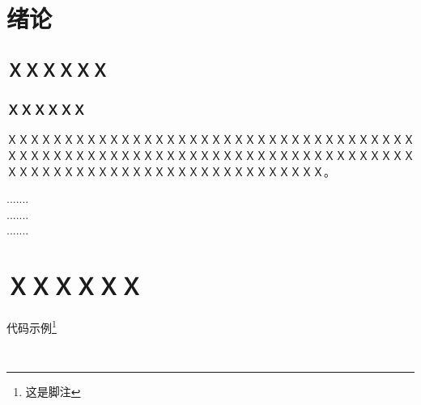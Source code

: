 \documentclass[a4paper]{ltxdoc}
\begin{document}
{
\setlength{\cftfignumwidth}{3.5em}
\setlength{\cfttabnumwidth}{3.5em}
\clearpage
\tableofcontents
{}

\clearpage
\listoffigures

\clearpage
\listoftables

}

\fancyhead{}
\pagestyle{fancy}

{
\setcounter{page}{1}
\pretocmd{\section}{\clearpage \vspace*{-2.0em}}{}{}

\setlength{\parindent}{2em}
\setlength{\parskip}{0.5em}
\setlength{\baselineskip}{22pt}

\section{绪论}
\subsection{ＸＸＸＸＸＸ}
\subsubsection{ＸＸＸＸＸＸ}
ＸＸＸＸＸＸＸＸＸＸＸＸＸＸＸＸＸＸＸＸＸＸＸＸＸＸＸＸＸＸＸＸＸＸＸＸＸＸＸＸＸＸＸＸＸＸＸＸＸＸＸＸＸＸＸＸＸＸＸＸＸＸＸＸＸＸＸＸＸＸＸＸＸＸＸＸＸＸＸＸＸＸＸＸＸＸＸＸＸＸＸＸＸＸＸＸＸＸＸＸ。

\begin{center}
	.......\\
	.......\\
	.......
\end{center}

\section{ＸＸＸＸＸＸ}
代码示例\footnote{这是脚注}
\begin{verbatim}


\end{verbatim}}
\end{document}
